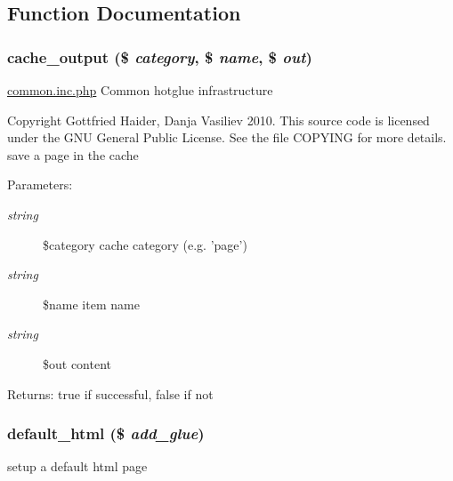 \subsection{Function Documentation}
\hypertarget{common_8inc_8php_6cceb5c6a3c421c18e925515c78f6dfd}{
\subsubsection[{cache\_\-output}]{\setlength{\rightskip}{0pt plus 5cm}cache\_\-output (\$ {\em category}, \/  \$ {\em name}, \/  \$ {\em out})}}
\label{common_8inc_8php_6cceb5c6a3c421c18e925515c78f6dfd}


\hyperlink{common_8inc_8php}{common.inc.php} Common hotglue infrastructure

Copyright Gottfried Haider, Danja Vasiliev 2010. This source code is licensed under the GNU General Public License. See the file COPYING for more details. save a page in the cache

\begin{Desc}
\item[Parameters:]
\begin{description}
\item[{\em string}]\$category cache category (e.g. 'page') \item[{\em string}]\$name item name \item[{\em string}]\$out content \end{description}
\end{Desc}
\begin{Desc}
\item[Returns:]true if successful, false if not \end{Desc}
\hypertarget{common_8inc_8php_8916cb6ec34ceeb3f48c86655c305974}{
\subsubsection[{default\_\-html}]{\setlength{\rightskip}{0pt plus 5cm}default\_\-html (\$ {\em add\_\-glue})}}
\label{common_8inc_8php_8916cb6ec34ceeb3f48c86655c305974}


setup a default html page

